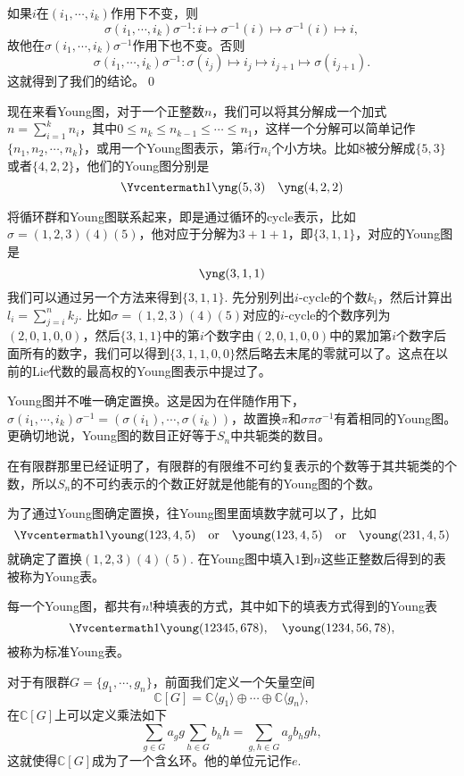 \documentclass[10pt]{article}
\newcommand{\cc}{\mathbb{C}}
\begin{document}
\proof 如果$i$在$(i_1,\cdots,i_k)$作用下不变，则
\[\sigma (i_1,\cdots,i_k)\sigma^{-1}:i\mapsto \sigma^{-1}(i)\mapsto \sigma^{-1}(i) \mapsto i,\]
故他在$\sigma (i_1,\cdots,i_k)\sigma^{-1}$作用下也不变。否则
\[
	\sigma (i_1,\cdots,i_k)\sigma^{-1}:\sigma(i_j)\mapsto i_j\mapsto i_{j+1} \mapsto \sigma(i_{j+1}).
\]
这就得到了我们的结论。\qed

\para 现在来看Young图，对于一个正整数$n$，我们可以将其分解成一个加式$n=\sum_{i=1}^k n_i$，其中$0\leq n_k\leq n_{k-1}\leq \cdots \leq n_1$，这样一个分解可以简单记作$\{n_1,n_2,\cdots,n_k\}$，或用一个Young图表示，第$i$行$n_i$个小方块。比如$8$被分解成$\{5,3\}$或者$\{4,2,2\}$，他们的Young图分别是
\[\Yvcentermath1
	\yng(5,3)\quad \yng(4,2,2)
\]

将循环群和Young图联系起来，即是通过循环的cycle表示，比如$\sigma=(1,2,3)(4)(5)$，他对应于分解为$3+1+1$，即$\{3,1,1\}$，对应的Young图是
\[
	\yng(3,1,1)
\]
我们可以通过另一个方法来得到$\{3,1,1\}$. 先分别列出$i$-cycle的个数$k_i$，然后计算出$l_i=\sum_{j=i}^nk_j$. 比如$\sigma=(1,2,3)(4)(5)$对应的$i$-cycle的个数序列为$(2,0,1,0,0)$，然后$\{3,1,1\}$中的第$i$个数字由$(2,0,1,0,0)$中的累加第$i$个数字后面所有的数字，我们可以得到$\{3,1,1,0,0\}$然后略去末尾的零就可以了。这点在以前的Lie代数的最高权的Young图表示中提过了。

Young图并不唯一确定置换。这是因为在伴随作用下，$\sigma (i_1,\cdots,i_k)\sigma^{-1}= (\sigma(i_1),\cdots,\sigma(i_k))$，故置换$\pi$和$\sigma\pi\sigma^{-1}$有着相同的Young图。更确切地说，Young图的数目正好等于$S_n$中共轭类的数目。

在有限群那里已经证明了，有限群的有限维不可约复表示的个数等于其共轭类的个数，所以$S_n$的不可约表示的个数正好就是他能有的Young图的个数。

\para 为了通过Young图确定置换，往Young图里面填数字就可以了，比如
\[\Yvcentermath1
	\young(123,4,5)\quad \text{or}\quad \young(123,4,5)\quad \text{or}\quad \young(231,4,5)
\]
就确定了置换$(1,2,3)(4)(5)$. 在Young图中填入$1$到$n$这些正整数后得到的表被称为Young表。

每一个Young图，都共有$n!$种填表的方式，其中如下的填表方式得到的Young表
\[\Yvcentermath1
	\young(12345,678),\quad \young(1234,56,78),
\]
被称为标准Young表。

\para 对于有限群$G=\{g_1,\cdots,g_n\}$，前面我们定义一个矢量空间
\[
	\cc [G]=\cc\langle g_1\rangle \oplus \cdots \oplus \cc\langle g_n\rangle,
\]
在$\cc [G]$上可以定义乘法如下
\[
	\sum_{g\in G} a_g g \sum_{h\in G} b_h h=\sum_{g,h\in G}a_gb_h gh,
\]
这就使得$\cc [G]$成为了一个含幺环。他的单位元记作$e$.
\end{document}
